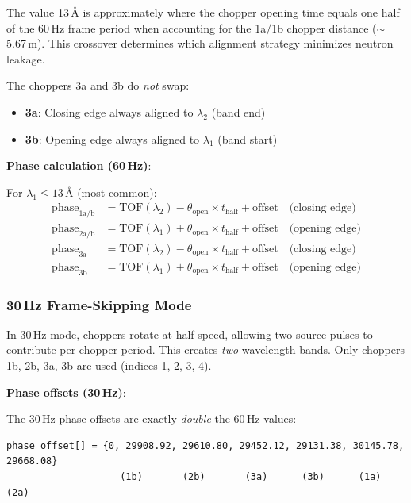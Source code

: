 \documentclass[11pt,letterpaper]{article}
\begin{document}
The value 13\,\AA{} is approximately where the chopper opening time equals one half of the 60\,Hz frame period when accounting for the 1a/1b chopper distance ($\sim$5.67\,m). This crossover determines which alignment strategy minimizes neutron leakage.

The choppers 3a and 3b do \emph{not} swap:
\begin{itemize}
    \item \textbf{3a}: Closing edge always aligned to $\lambda_2$ (band end)
    \item \textbf{3b}: Opening edge always aligned to $\lambda_1$ (band start)
\end{itemize}

\textbf{Phase calculation (60\,Hz)}:

For $\lambda_1 \leq 13$\,\AA{} (most common):
\begin{align}
\text{phase}_{1\text{a/b}} &= \text{TOF}(\lambda_2) - \theta_{\text{open}} \times t_{\text{half}} + \text{offset} \quad \text{(closing edge)} \\
\text{phase}_{2\text{a/b}} &= \text{TOF}(\lambda_1) + \theta_{\text{open}} \times t_{\text{half}} + \text{offset} \quad \text{(opening edge)} \\
\text{phase}_{3\text{a}} &= \text{TOF}(\lambda_2) - \theta_{\text{open}} \times t_{\text{half}} + \text{offset} \quad \text{(closing edge)} \\
\text{phase}_{3\text{b}} &= \text{TOF}(\lambda_1) + \theta_{\text{open}} \times t_{\text{half}} + \text{offset} \quad \text{(opening edge)}
\end{align}

\subsubsection{30\,Hz Frame-Skipping Mode}

In 30\,Hz mode, choppers rotate at half speed, allowing two source pulses to contribute per 
chopper period. This creates \emph{two} wavelength bands. Only choppers 1b, 2b, 3a, 3b are used 
(indices 1, 2, 3, 4).

\textbf{Phase offsets (30\,Hz)}:

The 30\,Hz phase offsets are exactly \emph{double} the 60\,Hz values:

\begin{verbatim}
phase_offset[] = {0, 29908.92, 29610.80, 29452.12, 29131.38, 30145.78, 29668.08}
                    (1b)       (2b)       (3a)      (3b)      (1a)      (2a)
\end{verbatim}
\end{document}
